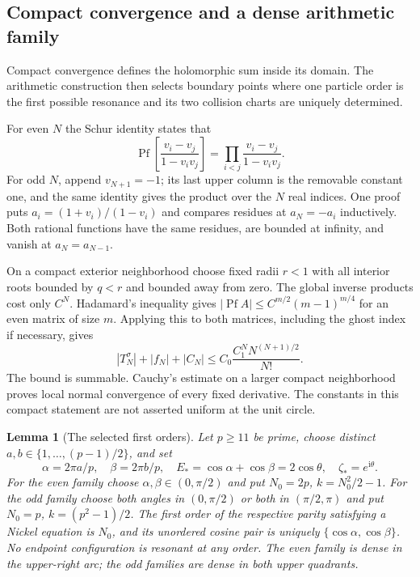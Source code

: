\documentclass[11pt]{article}
\numberwithin{equation}{section}
\newtheorem{lemma}[theorem]{Lemma}
\theoremstyle{definition}
\newcommand{\ii}{\mathrm i}
\DeclareMathOperator{\Pf}{Pf}
\begin{document}
\subsection{Compact convergence and a dense arithmetic family}

Compact convergence defines the holomorphic sum inside its domain.
The arithmetic construction then selects boundary points where one
particle order is the first possible resonance and its two collision
charts are uniquely determined.

For even $N$ the Schur identity states that
\[
 \Pf\left[\frac{v_i-v_j}{1-v_iv_j}\right]
 =\prod_{i<j}\frac{v_i-v_j}{1-v_iv_j}.
\]
For odd $N$, append $v_{N+1}=-1$; its last upper column is the removable
constant one, and the same identity gives the product over the $N$ real
indices. One proof puts $a_i=(1+v_i)/(1-v_i)$ and compares residues at
$a_N=-a_i$ inductively. Both rational functions have the same residues,
are bounded at infinity, and vanish at $a_N=a_{N-1}$.

On a compact exterior neighborhood choose fixed radii $r<1$ with all
interior roots bounded by $q<r$ and bounded away from zero. The global
inverse products cost only $C^N$. Hadamard's inequality gives
$|\Pf A|\le C^{m/2}(m-1)^{m/4}$ for an even matrix of size $m$.
Applying this to both matrices, including the ghost index if necessary,
gives
\begin{equation}
 |T_N^\sigma|+|f_N|+|C_N|
 \le C_0\frac{C_1^N N^{(N+1)/2}}{N!}.
 \label{iso:normal}
\end{equation}
The bound is summable. Cauchy's estimate on a larger compact neighborhood
proves local normal convergence of every fixed derivative. The constants
in this compact statement are not asserted uniform at the unit circle.

\begin{lemma}[The selected first orders]\label{iso:arithmetic}
Let $p\ge11$ be prime, choose distinct
$a,b\in\{1,\ldots,(p-1)/2\}$, and set
\[
 \alpha=2\pi a/p,\quad\beta=2\pi b/p,\quad
 E_*=\cos\alpha+\cos\beta=2\cos\theta,
 \quad\zeta_*=e^{\ii\theta}.
\]
For the even family choose $\alpha,\beta\in(0,\pi/2)$ and put
$N_0=2p$, $k=N_0^2/2-1$. For the odd family choose both angles in
$(0,\pi/2)$ or both in $(\pi/2,\pi)$ and put
$N_0=p$, $k=(p^2-1)/2$.
The first order of the respective parity satisfying a Nickel equation is
$N_0$, and its unordered cosine pair is uniquely
$\{\cos\alpha,\cos\beta\}$. No endpoint configuration is resonant at any
order. The even family is dense in the upper-right arc; the odd families
are dense in both upper quadrants.
\end{lemma}
\end{document}
